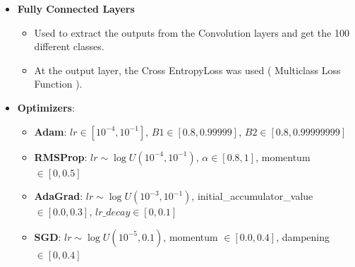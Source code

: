 \documentclass[conference]{IEEEtran}
\begin{document}
\begin{itemize}
    \item \textbf{Fully Connected Layers}
          \begin{itemize}
              \item Used to extract the outputs from the Convolution layers and get the 100 different classes.
              \item At the output layer, the Cross EntropyLoss was used ( Multiclass Loss Function ).
          \end{itemize}

    \item \textbf{Optimizers}:
          \begin{itemize}
              \item \textbf{Adam}: $lr \in [10^{-4}, 10^{-1}]$, $B1 \in [0.8, 0.99999]$, $B2 \in [0.8, 0.99999999]$
              \item \textbf{RMSProp}: $lr \sim \log U(10^{-4}, 10^{-1})$, $\alpha \in [0.8, 1]$, momentum $\in [0, 0.5]$
              \item \textbf{AdaGrad}: $lr \sim \log U(10^{-3}, 10^{-1})$, initial\_accumulator\_value $\in [0.0, 0.3]$, $lr\_decay \in [0, 0.1]$
              \item \textbf{SGD}: $lr \sim \log U(10^{-5}, 0.1)$, momentum $\in [0.0, 0.4]$, dampening $\in [0, 0.4]$
          \end{itemize}

\end{itemize}
\end{document}
